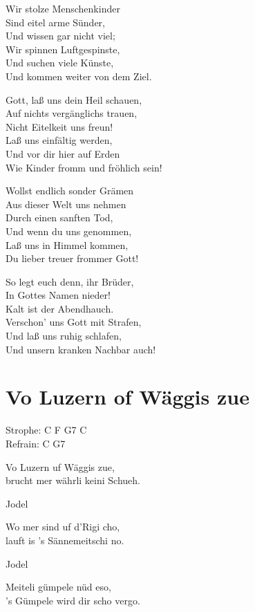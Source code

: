 \documentclass[
  letterpaper,
  twoside=false]{scrbook}
\begin{document}
Wir stolze Menschenkinder\\
Sind eitel arme Sünder,\\
Und wissen gar nicht viel;\\
Wir spinnen Luftgespinste,\\
Und suchen viele Künste,\\
Und kommen weiter von dem Ziel.

Gott, laß uns dein Heil schauen,\\
Auf nichts vergänglichs trauen,\\
Nicht Eitelkeit uns freun!\\
Laß uns einfältig werden,\\
Und vor dir hier auf Erden\\
Wie Kinder fromm und fröhlich sein!

Wollst endlich sonder Grämen\\
Aus dieser Welt uns nehmen\\
Durch einen sanften Tod,\\
Und wenn du uns genommen,\\
Laß uns in Himmel kommen,\\
Du lieber treuer frommer Gott!

So legt euch denn, ihr Brüder,\\
In Gottes Namen nieder!\\
Kalt ist der Abendhauch.\\
Verschon' uns Gott mit Strafen,\\
Und laß uns ruhig schlafen,\\
Und unsern kranken Nachbar auch!

\hypertarget{vo-luzern-of-wuxe4ggis-zue}{%
\chapter{Vo Luzern of Wäggis zue}\label{vo-luzern-of-wuxe4ggis-zue}}

Strophe: C F G7 C\\
Refrain: C G7

Vo Luzern uf Wäggis zue,\\
brucht mer währli keini Schueh.

Jodel

Wo mer sind uf d'Rigi cho,\\
lauft is 's Sännemeitschi no.

Jodel

Meiteli gümpele nüd eso,\\
's Gümpele wird dir scho vergo.
\end{document}
